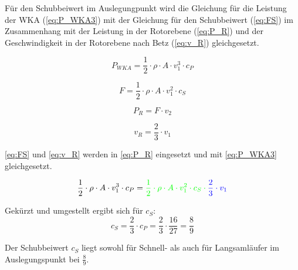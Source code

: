 Für den Schubbeiwert im Auslegungpunkt wird die Gleichung für die Leistung der WKA (\autoref{eq:P_WKA3}) mit der Gleichung für den Schubbeiwert (\autoref{eq:FS}) im Zusammenhang mit der Leistung in der Rotorebene (\autoref{eq:P_R})  und der Geschwindigkeit in der Rotorebene nach Betz (\autoref{eq:v_R}) gleichgesetzt. 

\begin{equation}
P_{WKA}= \frac{1}{2} \cdot \rho \cdot A \cdot v_1^3  \cdot c_P
\label{eq:P_WKA3} 
\end{equation}

\color{green}{}
\begin{equation}
F= \frac{1}{2} \cdot \rho \cdot A \cdot v_1^2  \cdot c_S
\label{eq:FS} 
\end{equation}
\color{black}{}


\begin{equation}
P_R= F \cdot v_2 
\label{eq:P_R} 
\end{equation}

\color{blue}{}
\begin{equation}
v_R= \frac{2}{3} \cdot v_1
\label{eq:v_R} 
\end{equation}
\color{black}{}


\autoref{eq:FS} und \autoref{eq:v_R} werden in \autoref{eq:P_R} eingesetzt und mit \autoref{eq:P_WKA3} gleichgesetzt. 

\begin{equation}
\frac{1}{2} \cdot \rho \cdot A \cdot v_1^3 \cdot c_P = \color{green}{}\frac{1}{2} \cdot \rho \cdot A \cdot v_1^2  \cdot c_S \cdot \color{blue}{}\frac{2}{3} \cdot v_1 \color{black}{}
\label{eq:c_s1} 
\end{equation}

Gekürzt und umgestellt ergibt sich für $c_S$:
\begin{equation}
c_S= \frac{2}{3} \cdot c_P = \frac{2}{3} \cdot \frac{16}{27} = \frac{8}{9}
\label{eq:c_S} 
\end{equation}

Der Schubbeiwert $c_S$ liegt sowohl für Schnell- als auch für Langsamläufer im Auslegungspunkt bei $\frac{8}{9}$.

\label{sec:Vorbereitungsfragen}
